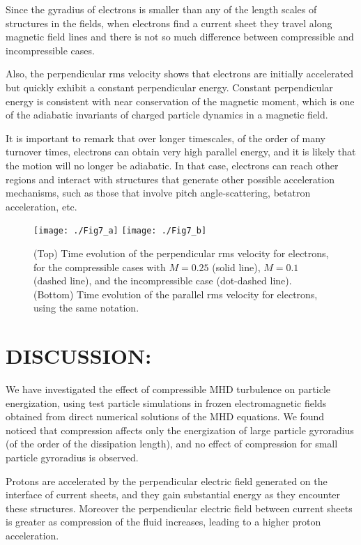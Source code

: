 \documentclass[%
aip,pop,amsmath,amssymb,
 reprint,%
]{revtex4-1}
\begin{document}
\clearpage

Since the gyradius of electrons is smaller than any of the length
scales of structures in the fields, when electrons find a current sheet they travel 
along magnetic field lines and there is not so much difference between compressible and 
incompressible cases.

Also, the perpendicular rms velocity shows that electrons are initially accelerated 
but quickly exhibit a constant perpendicular energy. Constant 
perpendicular energy is consistent with near conservation of the 
magnetic moment, which is one of the adiabatic invariants of charged particle dynamics in
a magnetic field.

It is important to remark that over longer timescales, of the order 
of many turnover times, 
electrons can obtain very high parallel energy, and 
it is likely that the motion will 
no longer be adiabatic.  In that case, 
electrons can reach other regions and interact with 
structures that generate other possible acceleration mechanisms, 
such as those that involve 
pitch angle-scattering, betatron acceleration, etc.



\begin{figure}[<t>]
\begin{center}
{\texttt{[image: ./Fig7\_a]}}
{\texttt{[image: ./Fig7\_b]}}
\caption{(Top) Time evolution of the perpendicular rms velocity for
electrons, for the compressible cases with $M=0.25$ (solid line), 
$M=0.1$ (dashed line), and the incompressible case (dot-dashed line). (Bottom) Time 
evolution of the parallel rms velocity for electrons, using the same notation.} 
\end{center}
\label{mean square velocity}
\end{figure}


\section{\label{sec:level4}DISCUSSION:}
We have investigated the effect of compressible MHD turbulence 
on particle energization, using test particle simulations in frozen electromagnetic fields
obtained from direct numerical solutions of the MHD equations. We found noticed that 
compression affects only the energization of large particle gyroradius (of the order of the 
dissipation length), and no effect of compression for small particle gyroradius is observed. 

Protons are accelerated by the perpendicular electric field generated on the interface of
current sheets, and they gain substantial energy as they encounter these structures. 
Moreover the perpendicular electric field between current sheets is greater as compression
of the fluid increases, leading to a higher proton acceleration. 
\end{document}
